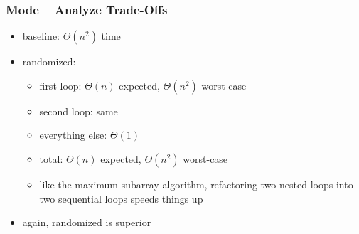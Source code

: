 \documentclass[10pt]{beamer}
\begin{document}
\begin{frame} \frametitle{Mode -- Analyze Trade-Offs}
  \begin{itemize}
    \item baseline: $\Theta(n^2)$ time
    \item randomized:
      \begin{itemize}
        \item first loop: $\Theta(n)$ expected, $\Theta(n^2)$ worst-case
        \item second loop: same
        \item everything else: $\Theta(1)$
        \item total: $\Theta(n)$ expected, $\Theta(n^2)$ worst-case
        \item like the maximum subarray algorithm, refactoring two nested loops into two sequential loops speeds things up
      \end{itemize}
    \item again, randomized is superior
  \end{itemize}
\end{frame}
\end{document}
